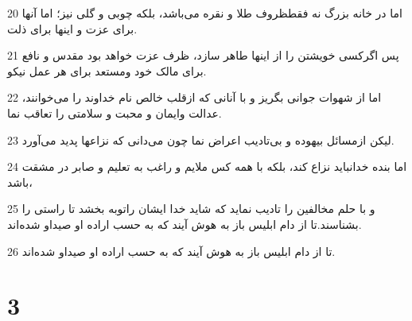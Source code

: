 \par 20 اما در خانه بزرگ نه فقطظروف طلا و نقره می‌باشد، بلکه چوبی و گلی نیز؛ اما آنها برای عزت و اینها برای ذلت.
\par 21 پس اگرکسی خویشتن را از اینها طاهر سازد، ظرف عزت خواهد بود مقدس و نافع برای مالک خود ومستعد برای هر عمل نیکو.
\par 22 اما از شهوات جوانی بگریز و با آنانی که ازقلب خالص نام خداوند را می‌خوانند، عدالت وایمان و محبت و سلامتی را تعاقب نما.
\par 23 لیکن ازمسائل بیهوده و بی‌تادیب اعراض نما چون می‌دانی که نزاعها پدید می‌آورد.
\par 24 اما بنده خدانباید نزاع کند، بلکه با همه کس ملایم و راغب به تعلیم و صابر در مشقت باشد،
\par 25 و با حلم مخالفین را تادیب نماید که شاید خدا ایشان راتوبه بخشد تا راستی را بشناسند.تا از دام ابلیس باز به هوش آیند که به حسب اراده او صیداو شده‌اند.
\par 26 تا از دام ابلیس باز به هوش آیند که به حسب اراده او صیداو شده‌اند.

\chapter{3}


